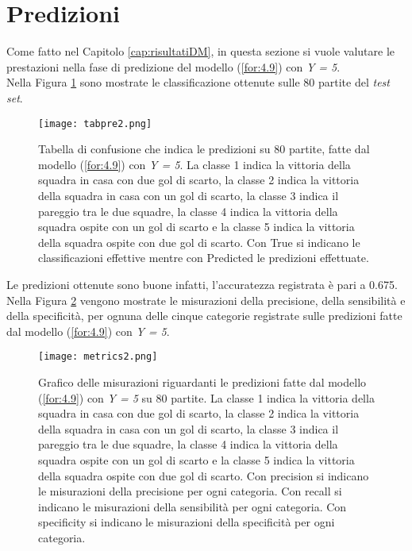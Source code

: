 \section{Predizioni}
Come fatto nel Capitolo \ref{cap:risultatiDM}, in questa sezione si vuole valutare le prestazioni nella fase di predizione del modello (\ref{for:4.9}) con \emph{Y = 5}.\\
Nella Figura \ref{fig:pre2} sono mostrate le classificazione ottenute sulle 80 partite del \emph{test set}.
\begin{figure}[h]
	\begin{center}
		\texttt{[image: tabpre2.png]}
		\caption{Tabella di confusione che indica le predizioni su 80 partite, fatte dal modello (\ref{for:4.9}) con \emph{Y = 5}. La classe 1 indica la vittoria della squadra in casa con due gol di scarto, la classe 2 indica la vittoria della squadra in casa con un gol di scarto, la classe 3 indica il pareggio tra le due squadre, la classe 4 indica la vittoria della squadra ospite con un gol di scarto e la classe 5 indica la vittoria della squadra ospite con due gol di scarto. Con \textsf{True} si indicano le classificazioni effettive mentre con \textsf{Predicted} le predizioni effettuate.}\label{fig:pre2}
	\end{center}
\end{figure}
Le predizioni ottenute sono buone infatti, l'accuratezza registrata è pari a 0.675. Nella Figura \ref{fig:metrics} vengono mostrate le misurazioni della precisione, della sensibilità e della specificità, per ognuna delle cinque categorie registrate sulle predizioni fatte dal modello (\ref{for:4.9}) con \emph{Y = 5}.
\begin{figure}[h]
	\begin{center}
		\texttt{[image: metrics2.png]}
		\caption{Grafico delle misurazioni riguardanti le predizioni fatte dal modello (\ref{for:4.9}) con \emph{Y = 5} su 80 partite. La classe 1 indica la vittoria della squadra in casa con due gol di scarto, la classe 2 indica la vittoria della squadra in casa con un gol di scarto, la classe 3 indica il pareggio tra le due squadre, la classe 4 indica la vittoria della squadra ospite con un gol di scarto e la classe 5 indica la vittoria della squadra ospite con due gol di scarto. Con \textsf{precision} si indicano le misurazioni della precisione per ogni categoria. Con \textsf{recall} si indicano le misurazioni della sensibilità per ogni categoria. Con \textsf{specificity} si indicano le misurazioni della specificità per ogni categoria.}\label{fig:metrics}
	\end{center}
\end{figure}
